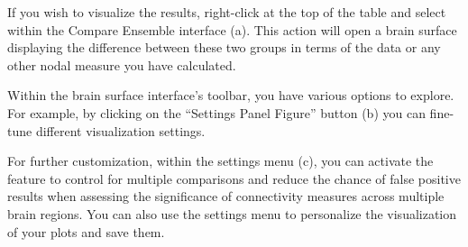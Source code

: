 \documentclass[justified]{tufte-handout}
\begin{document}
If you wish to visualize the results, right-click at the top of the table and select  within the Compare Ensemble interface (a). This action will open a brain surface displaying the difference between these two groups in terms of the  data or any other nodal measure you have calculated.

Within the brain surface interface's toolbar, you have various options to explore. For example, by clicking on the “Settings Panel Figure” button (b) you can fine-tune different visualization settings.

For further customization, within the settings menu (c), you can activate the  feature to control for multiple comparisons and reduce the chance of false positive results when assessing the significance of connectivity measures across multiple brain regions. You can also use the settings menu to personalize the visualization of your plots and save them.
\end{document}
